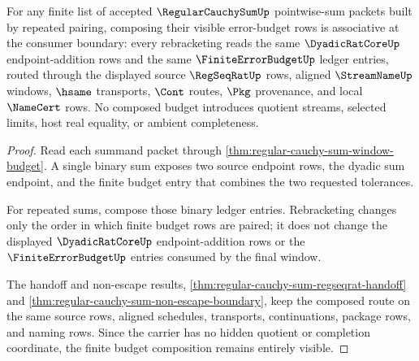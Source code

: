 \begin{theorem}
\label{thm:regular-cauchy-sum-budget-associative-visibility}
For any finite list of accepted $\RegularCauchySumUp$ pointwise-sum packets built by repeated pairing, composing their visible error-budget rows is associative at the consumer boundary: every rebracketing reads the same $\DyadicRatCoreUp$ endpoint-addition rows and the same $\FiniteErrorBudgetUp$ ledger entries, routed through the displayed source $\RegSeqRatUp$ rows, aligned $\StreamNameUp$ windows, $\hsame$ transports, $\Cont$ routes, $\Pkg$ provenance, and local $\NameCert$ rows. No composed budget introduces quotient streams, selected limits, host real equality, or ambient completeness.
\end{theorem}
\begin{proof}
Read each summand packet through \autoref{thm:regular-cauchy-sum-window-budget}. A single binary sum exposes two source endpoint rows, the dyadic sum endpoint, and the finite budget entry that combines the two requested tolerances.

For repeated sums, compose those binary ledger entries. Rebracketing changes only the order in which finite budget rows are paired; it does not change the displayed $\DyadicRatCoreUp$ endpoint-addition rows or the $\FiniteErrorBudgetUp$ entries consumed by the final window.

The handoff and non-escape results, \autoref{thm:regular-cauchy-sum-regseqrat-handoff} and \autoref{thm:regular-cauchy-sum-non-escape-boundary}, keep the composed route on the same source rows, aligned schedules, transports, continuations, package rows, and naming rows. Since the carrier has no hidden quotient or completion coordinate, the finite budget composition remains entirely visible.
\end{proof}

